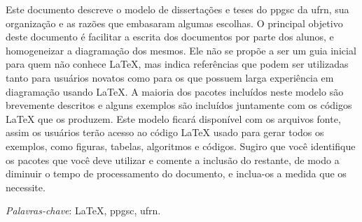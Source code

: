 \begin{resumo}
Este documento descreve o modelo de dissertações e teses do \gls{ppgsc} da \gls{ufrn}, sua organização e as razões que embasaram algumas escolhas. O principal objetivo deste documento é facilitar a escrita dos documentos por parte dos alunos, e homogeneizar a diagramação dos mesmos. Ele não se propõe a ser um guia inicial para quem não conhece \LaTeX{}, mas indica referências que podem ser utilizadas tanto para usuários novatos como para os que possuem larga experiência em diagramação usando \LaTeX{}. A maioria dos pacotes incluídos neste modelo são brevemente descritos e alguns exemplos são incluídos juntamente com os códigos \LaTeX{} que os produzem. Este modelo ficará disponível com os arquivos fonte, assim os usuários terão acesso ao código \LaTeX{} usado para gerar todos os exemplos, como figuras, tabelas, algoritmos e códigos. Sugiro que você identifique os pacotes que você deve utilizar e comente a inclusão do restante, de modo a diminuir o tempo de processamento do documento, e inclua-os a medida que os necessite.
 
  \bigbreak

  \noindent
  \textit{Palavras-chave}: \LaTeX{}, \gls{ppgsc}, \gls{ufrn}.
\end{resumo}